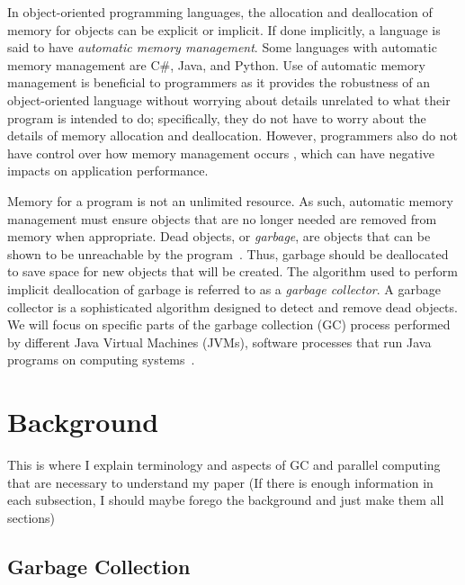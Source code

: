 \documentclass{sig-alternate}
\begin{document}
In object-oriented programming languages, the allocation and deallocation
of memory for objects can be explicit or implicit. If done implicitly,
a language is said to have \emph{automatic memory management}. Some languages 
with automatic memory management are C\#, Java, and Python.
Use of automatic memory management is beneficial to programmers as it provides
the robustness of an object-oriented language without worrying about
details unrelated to what their program is intended to do; specifically, they do
not have to worry about the details of memory allocation and deallocation. 
However, programmers also do not have control over how memory management occurs
, which can have negative impacts on application performance.

Memory for a program is not an unlimited resource. As such, automatic memory management
must ensure objects that are no longer needed are removed from memory
when appropriate. Dead objects, or \emph{garbage}, are objects that can be shown
to be unreachable by the program~\cite{glossary:g}. Thus, garbage should be deallocated to 
save space for new objects that will be created. The algorithm used to perform implicit
deallocation of garbage is referred to as a \emph{garbage collector}.
A garbage collector is a sophisticated algorithm designed to detect
and remove dead objects. We will focus on specific parts of the 
garbage collection (GC) process performed by different Java Virtual Machines 
(JVMs), software processes that run Java programs on computing systems~\cite{Lindblom:2011}.


\section{Background}
\label{sec:background}


This is where I explain terminology and aspects of GC and parallel 
computing that are necessary to understand my paper (If there is 
enough information in each subsection, I should maybe forego the 
background and just make them all sections)

\subsection{Garbage Collection}
\label{sec:garbageCollection}
\end{document}
